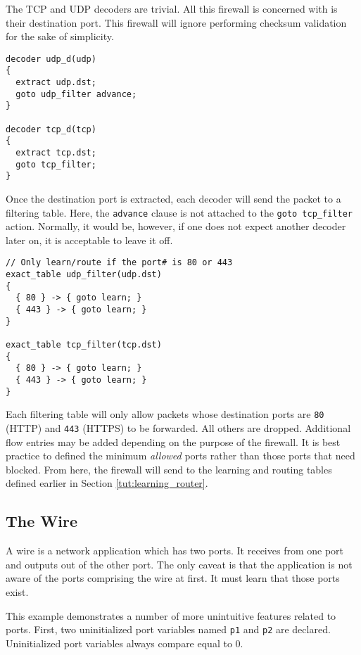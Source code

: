 The TCP and UDP decoders are trivial. All this firewall is concerned with is their destination port. This firewall will ignore performing checksum validation for the sake of simplicity. 

\begin{codepage}
\begin{lstlisting}
decoder udp_d(udp)
{
  extract udp.dst;
  goto udp_filter advance;
}

decoder tcp_d(tcp)
{
  extract tcp.dst;
  goto tcp_filter;
}
\end{lstlisting}
\end{codepage}

Once the destination port is extracted, each decoder will send the packet to 
a filtering table. Here, the \texttt{advance} clause is not attached to the 
\texttt{goto tcp\_filter} action. Normally, it would be, however, if one does 
not expect another decoder later on, it is acceptable to leave it off.

\begin{codepage}
\begin{lstlisting}
// Only learn/route if the port# is 80 or 443
exact_table udp_filter(udp.dst)
{
  { 80 } -> { goto learn; }
  { 443 } -> { goto learn; }
}

exact_table tcp_filter(tcp.dst)
{
  { 80 } -> { goto learn; }
  { 443 } -> { goto learn; }
}
\end{lstlisting}
\end{codepage}

Each filtering table will only allow packets whose destination ports are \texttt{80} (HTTP) and \texttt{443} (HTTPS) to be forwarded. All others are dropped. Additional flow entries may be added depending on the purpose of the firewall. It is best practice to defined the minimum \textit{allowed} ports rather than those ports that need blocked. From here, the firewall will send to the learning and routing tables defined earlier in Section \ref{tut:learning_router}.

\subsection{The Wire} \label{tut:wire}

A wire is a network application which has two ports. It receives from one port
and outputs out of the other port. The only caveat is that the application is
not aware of the ports comprising the wire at first. It must learn that those
ports exist.

This example demonstrates a number of more unintuitive features related to
ports. First, two uninitialized port variables named \texttt{p1} and
\texttt{p2} are declared. Uninitialized port variables always compare equal to 0.

